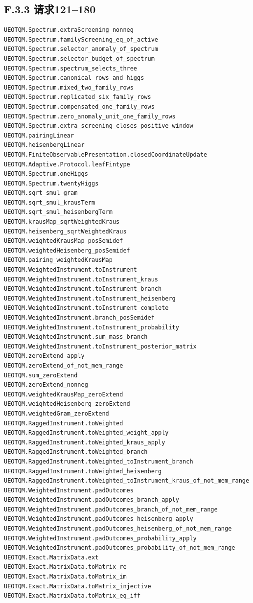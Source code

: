 \documentclass[
  11pt,
  oneside]{book}
\begin{document}
\hypertarget{f.3.3-ux8bf7ux6c42121180}{%
\subsection{F.3.3 请求121--180}\label{f.3.3-ux8bf7ux6c42121180}}

\begin{Verbatim}[breaklines,breakanywhere,fontsize=\scriptsize]
UEOTQM.Spectrum.extraScreening_nonneg
UEOTQM.Spectrum.familyScreening_eq_of_active
UEOTQM.Spectrum.selector_anomaly_of_spectrum
UEOTQM.Spectrum.selector_budget_of_spectrum
UEOTQM.Spectrum.spectrum_selects_three
UEOTQM.Spectrum.canonical_rows_and_higgs
UEOTQM.Spectrum.mixed_two_family_rows
UEOTQM.Spectrum.replicated_six_family_rows
UEOTQM.Spectrum.compensated_one_family_rows
UEOTQM.Spectrum.zero_anomaly_unit_one_family_rows
UEOTQM.Spectrum.extra_screening_closes_positive_window
UEOTQM.pairingLinear
UEOTQM.heisenbergLinear
UEOTQM.FiniteObservablePresentation.closedCoordinateUpdate
UEOTQM.Adaptive.Protocol.leafFintype
UEOTQM.Spectrum.oneHiggs
UEOTQM.Spectrum.twentyHiggs
UEOTQM.sqrt_smul_gram
UEOTQM.sqrt_smul_krausTerm
UEOTQM.sqrt_smul_heisenbergTerm
UEOTQM.krausMap_sqrtWeightedKraus
UEOTQM.heisenberg_sqrtWeightedKraus
UEOTQM.weightedKrausMap_posSemidef
UEOTQM.weightedHeisenberg_posSemidef
UEOTQM.pairing_weightedKrausMap
UEOTQM.WeightedInstrument.toInstrument
UEOTQM.WeightedInstrument.toInstrument_kraus
UEOTQM.WeightedInstrument.toInstrument_branch
UEOTQM.WeightedInstrument.toInstrument_heisenberg
UEOTQM.WeightedInstrument.toInstrument_complete
UEOTQM.WeightedInstrument.branch_posSemidef
UEOTQM.WeightedInstrument.toInstrument_probability
UEOTQM.WeightedInstrument.sum_mass_branch
UEOTQM.WeightedInstrument.toInstrument_posterior_matrix
UEOTQM.zeroExtend_apply
UEOTQM.zeroExtend_of_not_mem_range
UEOTQM.sum_zeroExtend
UEOTQM.zeroExtend_nonneg
UEOTQM.weightedKrausMap_zeroExtend
UEOTQM.weightedHeisenberg_zeroExtend
UEOTQM.weightedGram_zeroExtend
UEOTQM.RaggedInstrument.toWeighted
UEOTQM.RaggedInstrument.toWeighted_weight_apply
UEOTQM.RaggedInstrument.toWeighted_kraus_apply
UEOTQM.RaggedInstrument.toWeighted_branch
UEOTQM.RaggedInstrument.toWeighted_toInstrument_branch
UEOTQM.RaggedInstrument.toWeighted_heisenberg
UEOTQM.RaggedInstrument.toWeighted_toInstrument_kraus_of_not_mem_range
UEOTQM.WeightedInstrument.padOutcomes
UEOTQM.WeightedInstrument.padOutcomes_branch_apply
UEOTQM.WeightedInstrument.padOutcomes_branch_of_not_mem_range
UEOTQM.WeightedInstrument.padOutcomes_heisenberg_apply
UEOTQM.WeightedInstrument.padOutcomes_heisenberg_of_not_mem_range
UEOTQM.WeightedInstrument.padOutcomes_probability_apply
UEOTQM.WeightedInstrument.padOutcomes_probability_of_not_mem_range
UEOTQM.Exact.MatrixData.ext
UEOTQM.Exact.MatrixData.toMatrix_re
UEOTQM.Exact.MatrixData.toMatrix_im
UEOTQM.Exact.MatrixData.toMatrix_injective
UEOTQM.Exact.MatrixData.toMatrix_eq_iff
\end{Verbatim}
\end{document}
